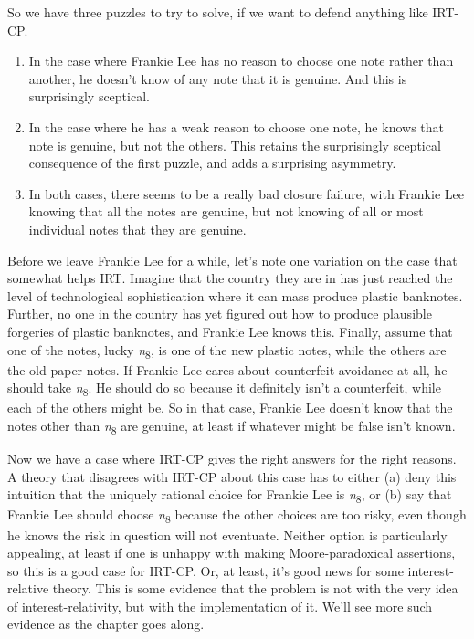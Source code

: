 \documentclass[
  12pt,
  letterpaper,
]{scrbook}
\providecommand{\tightlist}{%
  \setlength{\itemsep}{0pt}\setlength{\parskip}{0pt}}\usepackage{longtable,booktabs,array}
\begin{document}
So we have three puzzles to try to solve, if we want to defend anything
like IRT-CP.

\begin{enumerate}
\def\labelenumi{\arabic{enumi}.}
\tightlist
\item
  In the case where Frankie Lee has no reason to choose one note rather
  than another, he doesn't know of any note that it is genuine. And this
  is surprisingly sceptical.
\item
  In the case where he has a weak reason to choose one note, he knows
  that note is genuine, but not the others. This retains the
  surprisingly sceptical consequence of the first puzzle, and adds a
  surprising asymmetry.
\item
  In both cases, there seems to be a really bad closure failure, with
  Frankie Lee knowing that all the notes are genuine, but not knowing of
  all or most individual notes that they are genuine.
\end{enumerate}

Before we leave Frankie Lee for a while, let's note one variation on the
case that somewhat helps IRT. Imagine that the country they are in has
just reached the level of technological sophistication where it can mass
produce plastic banknotes. Further, no one in the country has yet
figured out how to produce plausible forgeries of plastic banknotes, and
Frankie Lee knows this. Finally, assume that one of the notes, lucky
\emph{n}\textsubscript{8}, is one of the new plastic notes, while the
others are the old paper notes. If Frankie Lee cares about counterfeit
avoidance at all, he should take \emph{n}\textsubscript{8}. He should do
so because it definitely isn't a counterfeit, while each of the others
might be. So in that case, Frankie Lee doesn't know that the notes other
than \emph{n}\textsubscript{8} are genuine, at least if whatever might
be false isn't known.

Now we have a case where IRT-CP gives the right answers for the right
reasons. A theory that disagrees with IRT-CP about this case has to
either (a) deny this intuition that the uniquely rational choice for
Frankie Lee is \emph{n}\textsubscript{8}, or (b) say that Frankie Lee
should choose \emph{n}\textsubscript{8} because the other choices are
too risky, even though he knows the risk in question will not eventuate.
Neither option is particularly appealing, at least if one is unhappy
with making Moore-paradoxical assertions, so this is a good case for
IRT-CP. Or, at least, it's good news for some interest-relative theory.
This is some evidence that the problem is not with the very idea of
interest-relativity, but with the implementation of it. We'll see more
such evidence as the chapter goes along.
\end{document}
